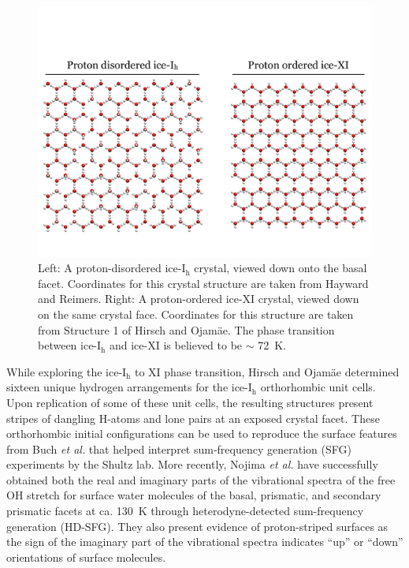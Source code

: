 \begin{figure}
\includegraphics[width=\linewidth]{Figures/iceTransition}
\caption{\label{fig:iceTransition}Left: A proton-disordered
  ice-I$_\mathrm{h}$ crystal, viewed down onto the basal
  facet. Coordinates for this crystal structure are taken from
  Hayward and Reimers.\cite{Hayward1997} Right:
  A proton-ordered ice-XI crystal, viewed down on the same crystal
  face. Coordinates for this structure are taken from Structure 1 of
  Hirsch and Ojam\"{a}e.\cite{Hirsch2004} The phase transition between
ice-I$_\mathrm{h}$ and ice-XI is believed to be $\sim$ 72~K.}
\end{figure}

While exploring the ice-I$_\mathrm{h}$ to XI phase transition, Hirsch
and Ojam\"{a}e determined sixteen unique hydrogen arrangements for the
ice-I$_\mathrm{h}$ orthorhombic unit cells.\cite{Hirsch2004} Upon
replication of some of these unit cells, the resulting structures
present stripes of dangling H-atoms and lone pairs at an exposed
crystal facet. These orthorhombic initial configurations can be used
to reproduce the surface features from Buch \textit{et
  al.}\cite{Buch2008} that helped interpret sum-frequency generation
(SFG) experiments by the Shultz lab.\cite{Groenzin2007} More recently,
Nojima \textit{et al.}\cite{Nojima2017} have successfully obtained
both the real and imaginary parts of the vibrational spectra of the
free OH stretch for surface water molecules of the basal, prismatic,
and secondary prismatic facets at ca. 130~K through
heterodyne-detected sum-frequency generation (HD-SFG). They also
present evidence of proton-striped surfaces as the sign of the
imaginary part of the vibrational spectra indicates ``up'' or ``down''
orientations of surface molecules.

